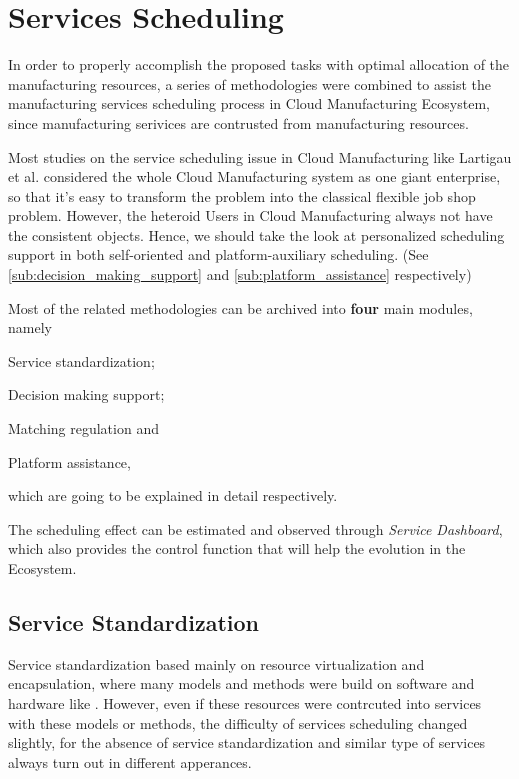 \section{Services Scheduling} %
\label{sec:schedule}

In order to properly accomplish the proposed tasks with optimal allocation of the manufacturing resources, a series of methodologies were combined to assist the manufacturing services scheduling process in Cloud Manufacturing Ecosystem, since manufacturing serivices are contrusted from manufacturing resources. 

Most studies on the service scheduling issue in Cloud Manufacturing like Lartigau et al.\cite{Lartigau2012} considered the whole Cloud Manufacturing system as one giant enterprise, so that it's easy to transform the problem into the classical flexible job shop problem. However, the heteroid Users in Cloud Manufacturing always not have the consistent objects. Hence, we should take the look at personalized scheduling support in both self-oriented and platform-auxiliary scheduling. (See \autoref{sub:decision_making_support} and \ref{sub:platform_assistance} respectively)

Most of the related methodologies can be archived into \textbf{four} main modules, namely
\begin{inparaenum}[1)]
\item Service standardization;
\item Decision making support;
\item Matching regulation and
\item Platform assistance,
\end{inparaenum} which are going to be explained in detail respectively.

The scheduling effect can be estimated and observed through \textit{Service Dashboard}, which also provides the control function that will help the evolution in the Ecosystem.

\subsection{Service Standardization} %
\label{sub:service_standardization}
Service standardization based mainly on  resource virtualization and encapsulation, where many models and methods were build on software and hardware like \cite{Li2011,Wu2011,Li2011a,Liu2011}. However, even if these resources were contrcuted into services with these models or methods, the difficulty of services scheduling changed slightly, for the absence of service standardization and similar type of services always turn out in different apperances.

